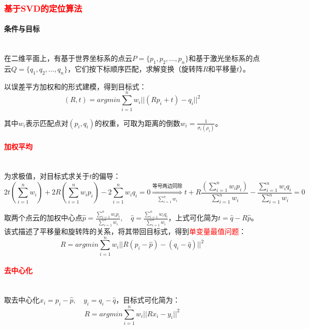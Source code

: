 \documentclass[
12pt, %
a4paper, 
oneside, %
]{scrartcl}
\begin{document}
\subsubsection[基于SVD的定位算法]{\textcolor{red}{基于SVD的定位算法}}
\paragraph{条件与目标}~\\

在二维平面上，有基于世界坐标系的点云$ P = \{p_1, p_2, \dots, p_n\} $和基于激光坐标系的点云$ Q = \{q_1, q_2, \dots, q_n\} $，它们按下标顺序匹配，求解变换（旋转阵$ R $和平移量$ t $）。

以误差平方加权和的形式建模，得到目标式：
$$ (R, t) = argmin \sum_{i = 1}^{n}w_i ||(R p_i + t) - q_i||^2 $$

其中$ w_i $表示匹配点对$ (p_i, q_i) $的权重，可取为距离的倒数$ w_i = \frac{1}{\sigma_i(\rho_i)} $。
\paragraph{\textcolor{red}{加权平均}}~\\

为求极值，对目标式求关于$ t $的偏导：
$$ 2t(\sum_{i = 1}^{n} w_i) + 2R(\sum_{i = 1}^{n} w_i p_i) - 2\sum_{i = 1}^{n} w_i q_i = 0 \overset{\text{等号两边同除}}{\underset{\sum_{i = 1}^{n} w_i}{\Longrightarrow}} t + R\frac{(\sum_{i = 1}^{n} w_i p_i)}{\sum_{i = 1}^{n} w_i} - \frac{\sum_{i = 1}^{n} w_i q_i}{\sum_{i = 1}^{n} w_i} = 0 $$

取两个点云的加权中心点$ \hat{p} = \frac{\sum_{i = 1}^{n} w_i p_i}{\sum_{i = 1}^{n} w_i}, \quad \hat{q} = \frac{\sum_{i = 1}^{n} w_i q_i}{\sum_{i = 1}^{n} w_i} $，上式可化简为$ t = \hat{q} - R \hat{p} $。该式描述了平移量和旋转阵的关系，将其带回目标式，得到\textcolor{red}{单变量最值问题}：
$$ R = argmin \sum_{i = 1}^{n}w_i ||R(p_i - \hat{p}) - (q_i - \hat{q})||^2 $$
\paragraph{\textcolor{red}{去中心化}}~\\

取去中心化$ x_i = p_i - \hat{p}, \quad y_i = q_i - \hat{q} $，目标式可化简为：
$$ R = argmin \sum_{i = 1}^{n}w_i ||R x_i - y_i||^2 $$
\end{document}
